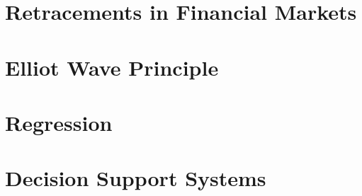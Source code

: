 \section{Retracements in Financial Markets}
\label{section:retracements-in-financial-markets:related}

\section{Elliot Wave Principle}
\label{section:elliot-wave-principle:related}

\section{Regression}
\label{section:regression:related}

\section{Decision Support Systems}
\label{section:decision-support-systems:related}